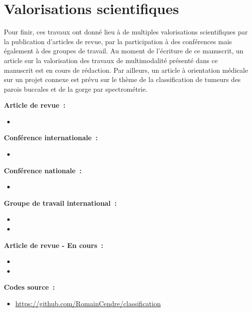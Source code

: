 \section*{Valorisations scientifiques}
Pour finir, ces travaux ont donné lieu à de multiples valorisations scientifiques par la publication d'articles de revue, par la participation à des conférences mais également à des groupes de travail. Au moment de l'écriture de ce manuscrit, un article sur la valorisation des travaux de multimodalité présenté dans ce manuscrit est en cours de rédaction. Par ailleurs, un article à orientation médicale sur un projet connexe est prévu sur le thème de la classification de tumeurs des parois buccales et de la gorge par spectrométrie.\par

\textbf{Article de revue~:}
\vspace{-0.1cm}
\begin{itemize}
    \item {}
\end{itemize}

\textbf{Conférence internationale~:}
\vspace{-0.2cm}
\begin{itemize}
    \item {}
\end{itemize}

\textbf{Conférence nationale~:}
\vspace{-0.2cm}
\begin{itemize}
    \item {}
\end{itemize}

\textbf{Groupe de travail international~:}
\vspace{-0.2cm}
\begin{itemize}
    \item {}
    \item {}
\end{itemize}

\textbf{Article de revue - En cours~:}
\vspace{-0.1cm}
\begin{itemize}
    \item {}
    \item {}
\end{itemize}

\textbf{Codes source~:}
\vspace{-0.2cm}
\begin{itemize}
    \item \href{https://github.com/RomainCendre/classification}{https://github.com/RomainCendre/classification}
\end{itemize}